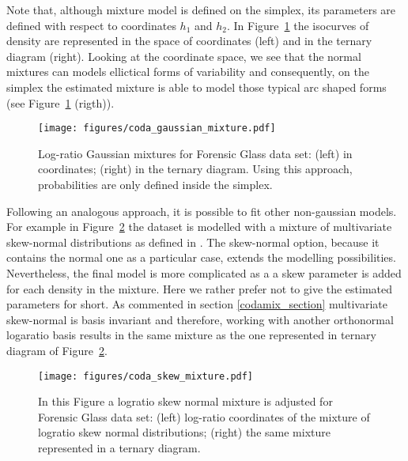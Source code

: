 \documentclass[12pt, a4paper]{article}
\begin{document}
{\small  }

Note that, although mixture model is defined on the simplex, its parameters are defined with respect to coordinates $h_1$ and $h_2$. In Figure~\ref{fig07fittingcodaGaussian} the isocurves of density are represented in the space
of coordinates (left) and in the ternary diagram (right). Looking at the coordinate space, we see that the normal mixtures can models ellictical forms of variability and consequently, on the simplex the estimated mixture is able to model those typical arc shaped forms (see Figure~\ref{fig07fittingcodaGaussian} (rigth)).

\begin{figure}[htbp]
\centering
\texttt{[image: figures/coda\_gaussian\_mixture.pdf]}\\
\caption{Log-ratio Gaussian mixtures for Forensic Glass data set: (left) in coordinates; (right) in the ternary diagram. Using this approach, probabilities are only defined inside the simplex.}
\label{fig07fittingcodaGaussian}
\end{figure}


Following an analogous approach, it is possible to fit other non-gaussian models. For example in Figure~\ref{skewcodadist} the dataset is modelled with a mixture of multivariate skew-normal distributions as defined in \citep{prates2013mixsmsn}. The skew-normal option, because it contains the normal one as a particular case, extends the modelling possibilities. Nevertheless, the final model is more complicated as a a skew parameter is added for each density in the mixture. Here we rather prefer not to give the estimated parameters for short. As commented in section \ref{codamix_section} multivariate skew-normal is basis invariant and therefore, working with another orthonormal logaratio basis results in the same mixture as the one represented in ternary diagram of Figure~\ref{skewcodadist}. 

\begin{figure}[htbp]
\centering
\texttt{[image: figures/coda\_skew\_mixture.pdf]}\\%
\caption{In this Figure a logratio skew normal mixture is adjusted for Forensic Glass data set: (left) log-ratio coordinates of the mixture of logratio skew normal distributions; (right) the same mixture represented in a ternary diagram.}
\label{skewcodadist}
\end{figure}
\end{document}
